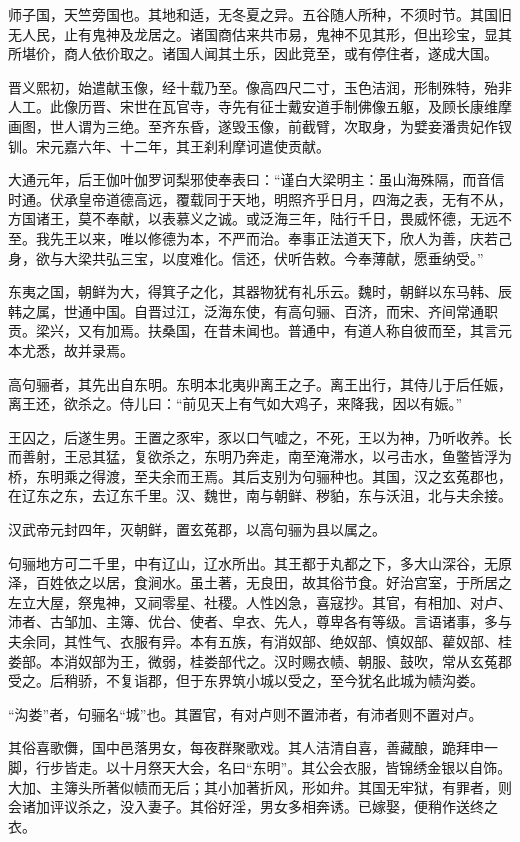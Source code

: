 \documentclass[12pt,UTF8]{ctexbook}
\begin{document}
师子国，天竺旁国也。其地和适，无冬夏之异。五谷随人所种，不须时节。其国旧无人民，止有鬼神及龙居之。诸国商估来共市易，鬼神不见其形，但出珍宝，显其所堪价，商人依价取之。诸国人闻其土乐，因此竞至，或有停住者，遂成大国。

晋义熙初，始遣献玉像，经十载乃至。像高四尺二寸，玉色洁润，形制殊特，殆非人工。此像历晋、宋世在瓦官寺，寺先有征士戴安道手制佛像五躯，及顾长康维摩画图，世人谓为三绝。至齐东昏，遂毁玉像，前截臂，次取身，为嬖妾潘贵妃作钗钏。宋元嘉六年、十二年，其王刹利摩诃遣使贡献。

大通元年，后王伽叶伽罗诃梨邪使奉表曰：“谨白大梁明主：虽山海殊隔，而音信时通。伏承皇帝道德高远，覆载同于天地，明照齐乎日月，四海之表，无有不从，方国诸王，莫不奉献，以表慕义之诚。或泛海三年，陆行千日，畏威怀德，无远不至。我先王以来，唯以修德为本，不严而治。奉事正法道天下，欣人为善，庆若己身，欲与大梁共弘三宝，以度难化。信还，伏听告敕。今奉薄献，愿垂纳受。”

东夷之国，朝鲜为大，得箕子之化，其器物犹有礼乐云。魏时，朝鲜以东马韩、辰韩之属，世通中国。自晋过江，泛海东使，有高句骊、百济，而宋、齐间常通职贡。梁兴，又有加焉。扶桑国，在昔未闻也。普通中，有道人称自彼而至，其言元本尤悉，故并录焉。

高句骊者，其先出自东明。东明本北夷丱离王之子。离王出行，其侍儿于后任娠，离王还，欲杀之。侍儿曰：“前见天上有气如大鸡子，来降我，因以有娠。”

王囚之，后遂生男。王置之豕牢，豕以口气嘘之，不死，王以为神，乃听收养。长而善射，王忌其猛，复欲杀之，东明乃奔走，南至淹滞水，以弓击水，鱼鳖皆浮为桥，东明乘之得渡，至夫余而王焉。其后支别为句骊种也。其国，汉之玄菟郡也，在辽东之东，去辽东千里。汉、魏世，南与朝鲜、秽貃，东与沃沮，北与夫余接。

汉武帝元封四年，灭朝鲜，置玄菟郡，以高句骊为县以属之。

句骊地方可二千里，中有辽山，辽水所出。其王都于丸都之下，多大山深谷，无原泽，百姓依之以居，食涧水。虽土著，无良田，故其俗节食。好治宫室，于所居之左立大屋，祭鬼神，又祠零星、社稷。人性凶急，喜寇抄。其官，有相加、对卢、沛者、古邹加、主簿、优台、使者、皁衣、先人，尊卑各有等级。言语诸事，多与夫余同，其性气、衣服有异。本有五族，有消奴部、绝奴部、慎奴部、雚奴部、桂娄部。本消奴部为王，微弱，桂娄部代之。汉时赐衣帻、朝服、鼓吹，常从玄菟郡受之。后稍骄，不复诣郡，但于东界筑小城以受之，至今犹名此城为帻沟娄。

“沟娄”者，句骊名“城”也。其置官，有对卢则不置沛者，有沛者则不置对卢。

其俗喜歌儛，国中邑落男女，每夜群聚歌戏。其人洁清自喜，善藏酿，跪拜申一脚，行步皆走。以十月祭天大会，名曰“东明”。其公会衣服，皆锦绣金银以自饰。大加、主簿头所著似帻而无后；其小加著折风，形如弁。其国无牢狱，有罪者，则会诸加评议杀之，没入妻子。其俗好淫，男女多相奔诱。已嫁娶，便稍作送终之衣。
\end{document}
